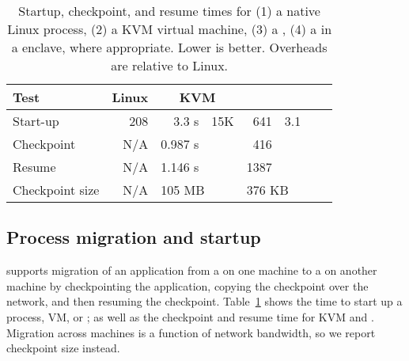 

\begin{table}[t!b!]
\footnotesize
\centering
\begin{tabular}{|l|r|rr|rr|rr|}
\hline
{\bf Test } & {\bf Linux } & \multicolumn{2}{c|}{{\bf KVM}}
& \multicolumn{2}{c|}{{\bf \graphene{}}} \\\hline

Start-up   & 208 \us{} & 3.3 s & 15K\x{} & 641 \us{} & 3.1\x{}  \\
\hline
Checkpoint & N/A   & 0.987 s  &  &   416 \us{} &  \\
\hline
Resume     & N/A   & 1.146 s  &  &  1387 \us{} & \\
\hline\hline
Checkpoint size & N/A & \multicolumn{2}{l|}{105 MB} & \multicolumn{2}{l|}{376 KB}   \\
\hline
\end{tabular}
\caption[Startup, checkpoint, and resume times in Linux, KVM, and \graphene{}]
{Startup, checkpoint, and resume times for (1) a native Linux process,
(2) a KVM virtual machine,
(3) a \graphene{} \picoproc{},
(4) a \graphene{} \picoproc{} in a \sgx{} enclave,
 where appropriate. Lower is better.  
Overheads are relative to Linux.} 
\label{tab:graphene:startup}
\end{table}

\subsection{Process migration and startup}
\label{sec:eval:graphene:startup}

\graphene{} supports migration of an application from a \picoproc{} on one machine
to a \picoproc{} on another machine by checkpointing the application,
copying the checkpoint over the network, and then resuming the checkpoint.
Table~\ref{tab:graphene:startup} shows the time to start
up a process, VM, or \picoproc{}; as well as the checkpoint and resume time for KVM and \graphene{}.
Migration across machines is a function of network bandwidth,
so we report checkpoint size instead. %


